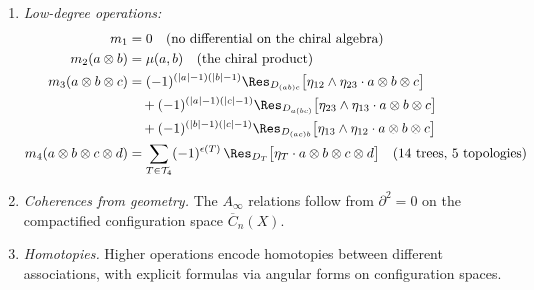 \begin{theorem}
\begin{enumerate}
\item \emph{Low-degree operations:}
\begin{align}
m_1 &= 0 \quad \text{(no differential on the chiral algebra)} \\
m_2(a \otimes b) &= \mu(a,b) \quad \text{(the chiral product)} \\
m_3(a \otimes b \otimes c) &=
  (-1)^{(|a|-1)(|b|-1)}
  \Res_{D_{(ab)c}}\bigl[\eta_{12} \wedge \eta_{23}
    \cdot a \otimes b \otimes c\bigr]
  \notag \\ &\quad
  + (-1)^{(|a|-1)(|c|-1)}
  \Res_{D_{a(bc)}}\bigl[\eta_{23} \wedge \eta_{13}
    \cdot a \otimes b \otimes c\bigr]
  \notag \\ &\quad
  + (-1)^{(|b|-1)(|c|-1)}
  \Res_{D_{(ac)b}}\bigl[\eta_{13} \wedge \eta_{12}
    \cdot a \otimes b \otimes c\bigr] \\
m_4(a \otimes b \otimes c \otimes d) &= \sum_{T \in \mathcal{T}_4}
  (-1)^{\epsilon(T)}\,\Res_{D_T}
  \bigl[\eta_T \cdot a \otimes b \otimes c \otimes d\bigr]
  \quad \text{($14$ trees, $5$ topologies)}
\end{align}

\item \emph{Coherences from geometry.} The $A_\infty$ relations follow from $\partial^2 = 0$ on the compactified configuration space $\overline{C}_n(X)$.

\item \emph{Homotopies.} Higher operations encode homotopies between different associations, with explicit formulas via angular forms on configuration spaces.
\end{enumerate}
\end{theorem}

